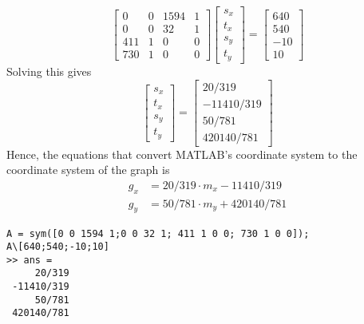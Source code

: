 \documentclass[a4paper]{article}
\begin{document}
\begin{equation}
	\begin{bmatrix}
		 0 & 0 & 1594 & 1\\
		 0 & 0 & 32 & 1\\
		 411 & 1 & 0 & 0\\
		 730 & 1 & 0 & 0
	\end{bmatrix}
	\begin{bmatrix}
		s_x\\t_x\\s_y\\t_y
	\end{bmatrix}
	=
	\begin{bmatrix}
		640\\540\\-10\\10
	\end{bmatrix}
\end{equation}
Solving this gives 
\begin{equation}
	\begin{bmatrix}
		s_x\\t_x\\s_y\\t_y
	\end{bmatrix}
	=
	\begin{bmatrix}
		20/319\\-11410/319\\50/781\\420140/781
	\end{bmatrix}
\end{equation}
Hence, the equations that convert MATLAB's coordinate system to the coordinate system of the graph is
\begin{equation}
	\begin{aligned}
		g_x &=  20/319 \cdot m_x - 11410/319\\
		g_y &=  50/781 \cdot m_y + 420140/781
	\end{aligned}
\end{equation}{\label{eq:conversion}}
\begin{verbatim}
A = sym([0 0 1594 1;0 0 32 1; 411 1 0 0; 730 1 0 0]);
A\[640;540;-10;10]
>> ans =
     20/319
 -11410/319
     50/781
 420140/781
\end{verbatim}
\begin{comment}
	>> A = sym([0 0 1594 1;0 0 32 1; 411 1 0 0; 730 1 0 0])
	 
	A =
	 
	[   0, 0, 1594, 1]
	[   0, 0,   32, 1]
	[ 411, 1,    0, 0]
	[ 730, 1,    0, 0]
	 
	>> B = inv(A)
	 
	B =
	 
	[       0,       0,  -1/319,    1/319]
	[       0,       0, 730/319, -411/319]
	[  1/1562, -1/1562,       0,        0]
	[ -16/781, 797/781,       0,        0]
	 
	>> B*[640;540;-10;10]
	 
	ans =
	 
	     20/319
	 -11410/319
	     50/781
	 420140/781
\end{comment}
\end{document}
